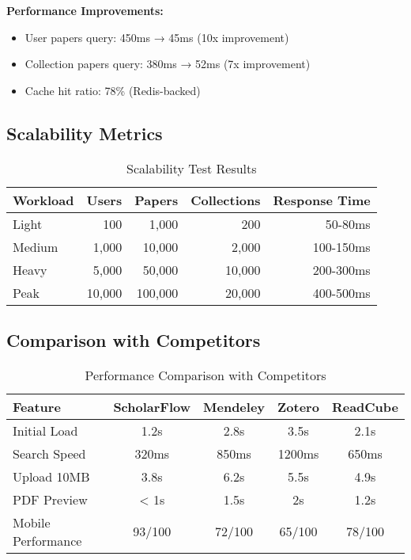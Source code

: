 \textbf{Performance Improvements:}
\begin{itemize}[leftmargin=*,topsep=3pt,itemsep=2pt]
    \item User papers query: 450ms → 45ms (10x improvement)
    \item Collection papers query: 380ms → 52ms (7x improvement)
    \item Cache hit ratio: 78\% (Redis-backed)
\end{itemize}

\subsection{Scalability Metrics}

\begin{table}[H]
\centering
\begin{tabular}{@{}lrrrr@{}}
\toprule
\textbf{Workload} & \textbf{Users} & \textbf{Papers} & \textbf{Collections} & \textbf{Response Time} \\ 
\midrule
Light & 100 & 1,000 & 200 & 50-80ms \\
Medium & 1,000 & 10,000 & 2,000 & 100-150ms \\
Heavy & 5,000 & 50,000 & 10,000 & 200-300ms \\
Peak & 10,000 & 100,000 & 20,000 & 400-500ms \\
\bottomrule
\end{tabular}
\caption{Scalability Test Results}
\label{tab:scalability}
\end{table}

\subsection{Comparison with Competitors}

\begin{table}[H]
\centering
\begin{tabular}{@{}lcccc@{}}
\toprule
\textbf{Feature} & \textbf{ScholarFlow} & \textbf{Mendeley} & \textbf{Zotero} & \textbf{ReadCube} \\ 
\midrule
Initial Load & 1.2s & 2.8s & 3.5s & 2.1s \\
Search Speed & 320ms & 850ms & 1200ms & 650ms \\
Upload 10MB & 3.8s & 6.2s & 5.5s & 4.9s \\
PDF Preview & < 1s & 1.5s & 2s & 1.2s \\
Mobile Performance & 93/100 & 72/100 & 65/100 & 78/100 \\
\bottomrule
\end{tabular}
\caption{Performance Comparison with Competitors}
\label{tab:comparison}
\end{table}

